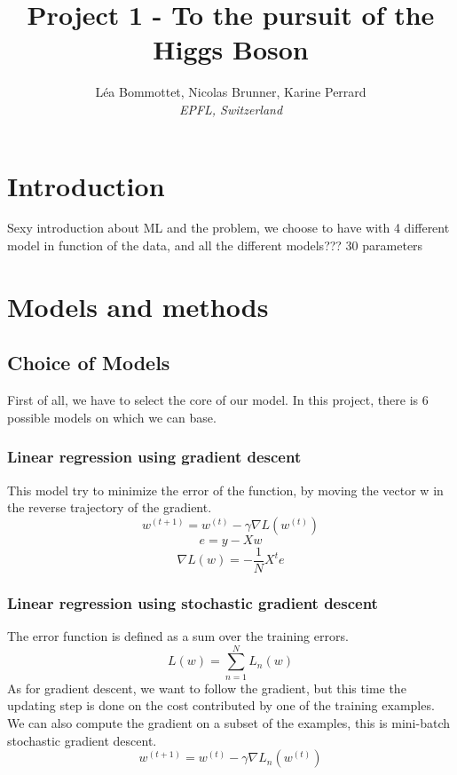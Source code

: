 \documentclass[10pt,conference,compsocconf]{IEEEtran}
\begin{document}
	\title{Project 1 - To the pursuit of the Higgs Boson}
	
	\author{
		L\'ea Bommottet, Nicolas Brunner, Karine Perrard\\
		\textit{ EPFL, Switzerland}
	}
	
	\maketitle
	
	\section{Introduction}
	
	Sexy introduction about ML and the problem,
	we choose to have  with 4 different model in function of the data, and all the different models???  
	30 parameters
	
	\section{Models and methods}
	
	\subsection{Choice of Models}
	First of all, we have to select the core of our model. In this project, there is 6 possible models on which we can base.
	\subsubsection{Linear regression using gradient descent}
	
	This model try to minimize the error of the function, by moving the vector w in the reverse trajectory of the gradient.
	$$w^{(t+1)}=w^{(t)} -\gamma \nabla L(w^{(t)})$$
	$$e = y-Xw$$
	$$\nabla L(w) = -\frac{1}{N}X^te$$
	
	\subsubsection{Linear regression using stochastic gradient descent}
	
	The error function is defined as a sum over the training errors. \\
	$$ L(w) = \sum\limits_{n=1}^N L_n(w)$$
	As for gradient descent, we want to follow the gradient, but this time the updating step is done on the cost contributed by one of the training examples. We can also compute the gradient on a subset of the examples, this is mini-batch stochastic gradient descent.
	$$w^{(t+1)}=w^{(t)} -\gamma \nabla L_n(w^{(t)})$$
	
\end{document}
